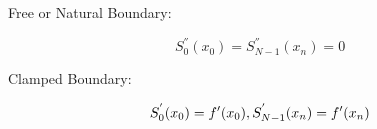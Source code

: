 \documentclass[12pt]{article}
\newcommand{\1}{\mathbbm 1}
\begin{document}
		
		Free or Natural Boundary: 
		
		\begin{equation}
			S_{0}^{''}(x_{0}) = S_{N-1}^{''}(x_{n}) = 0
		\end{equation}
		
		Clamped Boundary:  
		
		\begin{equation}
			S_{0}^{'}(x_{0}) = f'(x_{0}), \\ S_{N-1}^{'}(x_{n}) = f'(x_{n})
		\end{equation}
		
		
		
	
\end{document}
